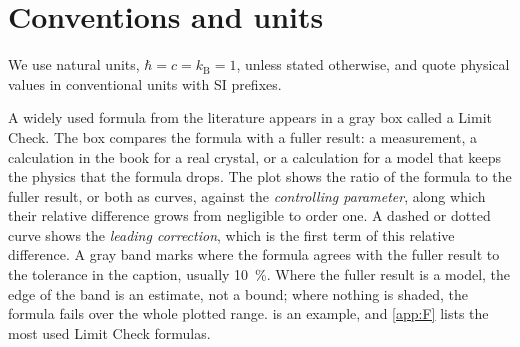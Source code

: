 \chapter*{Conventions and units}
We use natural units, $\hbar = c = k_{\mathrm{B}} = 1$, unless stated otherwise, and quote physical values in conventional units with SI prefixes.

A widely used formula from the literature appears in a gray box called a Limit Check. The box compares the formula with a fuller result: a measurement, a calculation in the book for a real crystal, or a calculation for a model that keeps the physics that the formula drops. The plot shows the ratio of the formula to the fuller result, or both as curves, against the \emph{controlling parameter}, along which their relative difference grows from negligible to order one. A dashed or dotted curve shows the \emph{leading correction}, which is the first term of this relative difference. A gray band marks where the formula agrees with the fuller result to the tolerance in the caption, usually \SI{10}{\percent}. Where the fuller result is a model, the edge of the band is an estimate, not a bound; where nothing is shaded, the formula fails over the whole plotted range.  is an example, and \cref{app:F} lists the most used Limit Check formulas.
